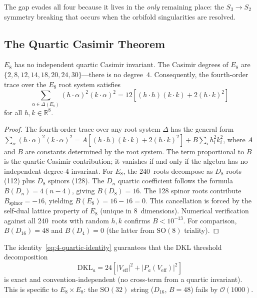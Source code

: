 \medskip\noindent
The gap evades all four because it lives in the \emph{only} remaining place: the $S_3 \to S_2$ symmetry breaking that occurs when the orbifold singularities are resolved.


\subsection{The Quartic Casimir Theorem}
\label{sec:4-quartic-casimir}

\begin{theorem}
\label{thm:4-quartic-casimir}
$E_8$ has no independent quartic Casimir invariant.  The Casimir degrees of $E_8$ are $\{2, 8, 12, 14, 18, 20, 24, 30\}$---there is no degree~$4$.  Consequently, the fourth-order trace over the $E_8$ root system satisfies
\begin{equation}
  \sum_{\alpha \in \Delta(E_8)} (h \cdot \alpha)^2 (k \cdot \alpha)^2
  = 12\!\left[(h \cdot h)(k \cdot k) + 2(h \cdot k)^2\right]
  \label{eq:4-quartic-identity}
\end{equation}
for all $h, k \in \mathbb{R}^8$.
\end{theorem}

\begin{proof}
The fourth-order trace over any root system $\Delta$ has the general form
$\sum_\alpha (h \cdot \alpha)^2 (k \cdot \alpha)^2 = A[(h \cdot h)(k \cdot k) + 2(h \cdot k)^2] + B \sum_i h_i^2 k_i^2$,
where $A$ and $B$ are constants determined by the root system.  The term proportional to $B$ is the quartic Casimir contribution; it vanishes if and only if the algebra has no independent degree-4 invariant.  For $E_8$, the 240~roots decompose as $D_8$ roots (112) plus $D_8$ spinors (128).  The $D_n$ quartic coefficient follows the formula $B(D_n) = 4(n-4)$, giving $B(D_8) = 16$.  The 128 spinor roots contribute $B_{\mathrm{spinor}} = -16$, yielding $B(E_8) = 16 - 16 = 0$.  This cancellation is forced by the self-dual lattice property of $E_8$ (unique in 8~dimensions).  Numerical verification against all 240~roots with random $h, k$ confirms $B < 10^{-13}$.  For comparison, $B(D_{16}) = 48$ and $B(D_4) = 0$ (the latter from $\mathrm{SO}(8)$ triality).
\end{proof}

The identity~\eqref{eq:4-quartic-identity} guarantees that the DKL threshold decomposition
\begin{equation}
  \mathrm{DKL}_a = 24\!\left[|V_{\mathrm{eff}}|^2 + |P_a(V_{\mathrm{eff}})|^2\right]
  \label{eq:4-dkl-decomposition}
\end{equation}
is exact and convention-independent (no cross-term from a quartic invariant).  This is specific to $E_8 \times E_8$: the $\mathrm{SO}(32)$ string ($D_{16}$, $B = 48$) fails by $\mathcal{O}(1000)$.


